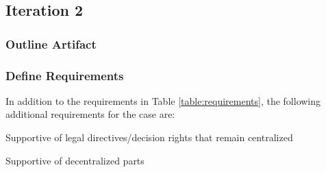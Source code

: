 

%




\subsection{Iteration 2}

\subsubsection*{Outline Artifact}



\subsubsection*{Define Requirements}

In addition to the requirements in Table \ref{table:requirements}, the following additional requirements for the case are:

Supportive of legal directives/decision rights that remain centralized

Supportive of decentralized parts
